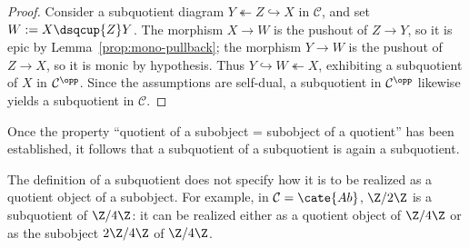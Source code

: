 \begin{proof}
	Consider a subquotient diagram $Y\twoheadleftarrow Z\hookrightarrow X$ in
	$\mathcal C$, and set $W:=X\dsqcup{Z}Y$. The morphism $X\to W$ is the
	pushout of $Z\to Y$, so it is epic by
	Lemma~\ref{prop:mono-pullback}; the morphism $Y\to W$ is the pushout of
	$Z\to X$, so it is monic by hypothesis. Thus
	$Y\hookrightarrow W\twoheadleftarrow X$, exhibiting a subquotient of $X$
	in $\mathcal C^{\opp}$. Since the assumptions are self-dual, a subquotient
	in $\mathcal C^{\opp}$ likewise yields a subquotient in $\mathcal C$.
\end{proof}

Once the property ``quotient of a subobject = subobject of a quotient'' has
been established, it follows that a subquotient of a subquotient is again a
subquotient.

The definition of a subquotient does not specify how it is to be realized as a
quotient object of a subobject. For example, in $\mathcal C=\cate{Ab}$,
$\Z/2\Z$ is a subquotient of $\Z/4\Z$: it can be realized either as a quotient
object of $\Z/4\Z$ or as the subobject $2\Z/4\Z$ of $\Z/4\Z$.
